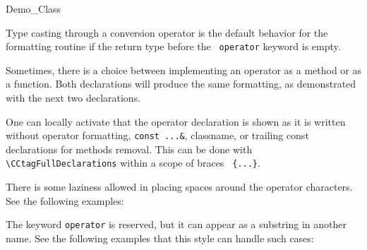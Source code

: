 \documentclass[12pt]{article}
\begin{document}
\begin{CCclass}{Demo_Class}
{Type casting through a conversion operator is the default behavior 
for the formatting routine if the return type before the {\tt 
operator} keyword is empty.



Sometimes, there is a choice between
implementing an operator as a method or as a function. Both
declarations will produce the same formatting, as demonstrated
with the next two declarations.



One can locally activate that the operator declaration is shown as it
is written without operator formatting, {\tt const ...\&}, classname, or
trailing const declarations for methods removal. This can be done with
\verb+\C+\verb+CtagFullDeclarations+ within a scope of braces {\tt
  \{...\}}.

{\CCtagFullDeclarations
}

There is some laziness allowed in placing spaces around the operator
characters. See the following examples:





The keyword {\tt operator} is reserved, but it can appear as a
substring in another name. See the following examples that this
style can handle such cases:






}
\end{CCclass}
\end{document}
